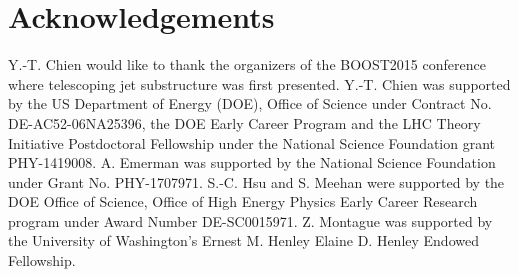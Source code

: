 \documentclass[aps,prl,floatfix,preprintnumbers,twocolumn,groupedaddress,nofootinbib]{revtex4-1}
\begin{document}
\section{Acknowledgements}
Y.-T. Chien would like to thank the organizers of the BOOST2015 conference where telescoping jet substructure was first presented. Y.-T. Chien was supported by the US Department of Energy (DOE), Office of Science under Contract No. DE-AC52-06NA25396, the DOE Early Career Program and the LHC Theory Initiative Postdoctoral Fellowship under the National Science Foundation grant PHY-1419008. A. Emerman was supported by the National Science Foundation under Grant No. PHY-1707971. S.-C. Hsu and S. Meehan were supported by the DOE Office of Science, Office of High Energy Physics Early Career Research program under Award Number DE-SC0015971. Z. Montague was supported by the University of Washington's Ernest M. Henley \text{\&} Elaine D. Henley Endowed Fellowship.



\end{document}
